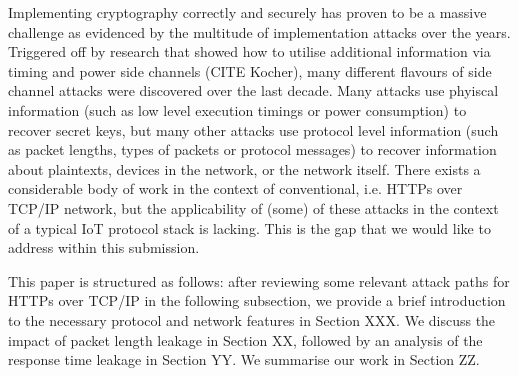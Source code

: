 \documentclass{article}
\begin{document}
Implementing cryptography correctly and securely has proven to be a massive challenge as evidenced by the multitude of implementation attacks over the years. Triggered off by research that showed how to utilise additional information via timing and power side channels (CITE Kocher), many different flavours of side channel attacks were discovered over the last decade. Many attacks use phyiscal information (such as low level execution timings or power consumption) to recover secret keys, but many other attacks use protocol level information (such as packet lengths, types of packets or protocol messages) to recover information about plaintexts, devices in the network, or the network itself. 
There exists a considerable body of work in the context of conventional, i.e. HTTPs over TCP/IP network, but the applicability of (some) of these attacks in the context of a typical IoT protocol stack is lacking. This is the gap that we would like to address within this submission. 

This paper is structured as follows: after reviewing some relevant attack paths for HTTPs over TCP/IP in the following subsection, we provide a brief introduction to the necessary protocol and network features in Section XXX.  We discuss the impact of packet length leakage in Section XX, followed by an analysis of the response time leakage in Section YY. We summarise our work in Section ZZ. 





%	


\end{document}
